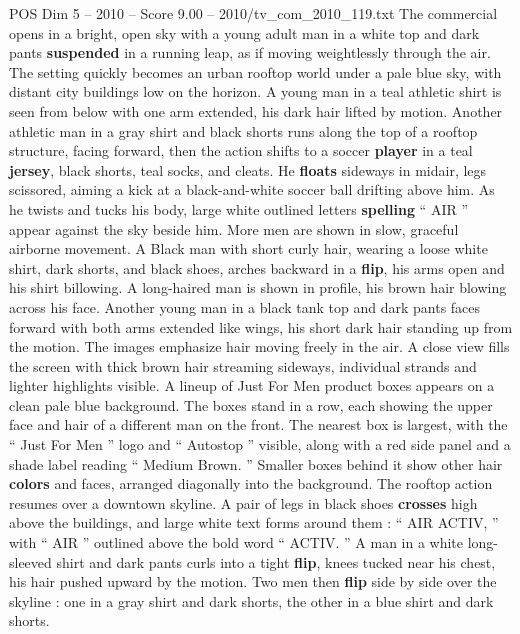 \begin{textsample}{POS Dim 5 – 2010 – Score 9.00 – 2010/tv\_com\_2010\_119.txt}  \label{ex:f5_pos_045}
The commercial opens in a bright, open sky with a young adult man in a white top and dark pants \textbf{suspended} in a running leap, as if moving weightlessly through the air.
The setting quickly becomes an urban rooftop world under a pale blue sky, with distant city buildings low on the horizon.
A young man in a teal athletic shirt is seen from below with one arm extended, his dark hair lifted by motion.
Another athletic man in a gray shirt and black shorts runs along the top of a rooftop structure, facing forward, then the action shifts to a soccer \textbf{player} in a teal \textbf{jersey}, black shorts, teal socks, and cleats.
He \textbf{floats} sideways in midair, legs scissored, aiming a kick at a black-and-white soccer ball drifting above him.
As he twists and tucks his body, large white outlined letters \textbf{spelling} “ AIR ” appear against the sky beside him.
More men are shown in slow, graceful airborne movement.
A Black man with short curly hair, wearing a loose white shirt, dark shorts, and black shoes, arches backward in a \textbf{flip}, his arms open and his shirt billowing.
A long-haired man is shown in profile, his brown hair blowing across his face.
Another young man in a black tank top and dark pants faces forward with both arms extended like wings, his short dark hair standing up from the motion.
The images emphasize hair moving freely in the air.
A close view fills the screen with thick brown hair streaming sideways, individual strands and lighter highlights visible.
A lineup of Just For Men product boxes appears on a clean pale blue background.
The boxes stand in a row, each showing the upper face and hair of a different man on the front.
The nearest box is largest, with the “ Just For Men ” logo and “ Autostop ” visible, along with a red side panel and a shade label reading “ Medium Brown. ” Smaller boxes behind it show other hair \textbf{colors} and faces, arranged diagonally into the background.
The rooftop action resumes over a downtown skyline.
A pair of legs in black shoes \textbf{crosses} high above the buildings, and large white text forms around them : “ AIR ACTIV, ” with “ AIR ” outlined above the bold word “ ACTIV. ” A man in a white long-sleeved shirt and dark pants curls into a tight \textbf{flip}, knees tucked near his chest, his hair pushed upward by the motion.
Two men then \textbf{flip} side by side over the skyline : one in a gray shirt and dark shorts, the other in a blue shirt and dark shorts.

\end{textsample}
